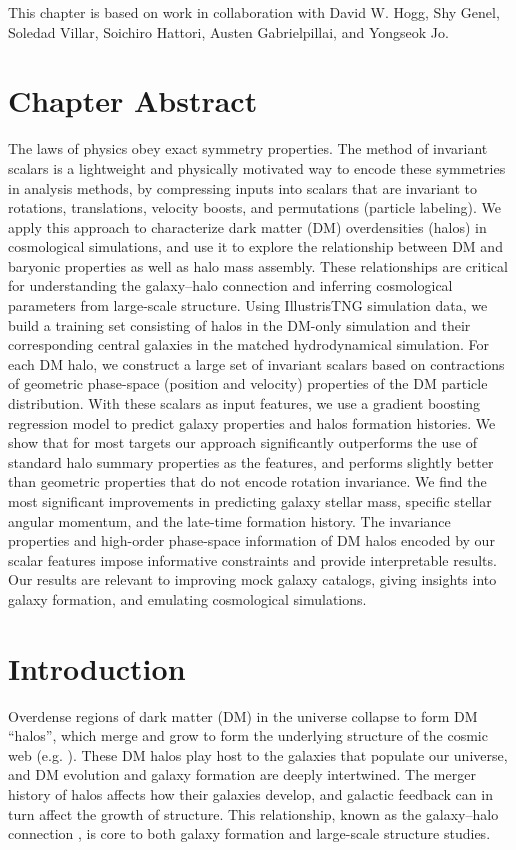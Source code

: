 This chapter is based on work in collaboration with David W. Hogg, Shy Genel, Soledad Villar, Soichiro Hattori, Austen Gabrielpillai, and Yongseok Jo.

\graphicspath{{figures/figures_eqcosmo/}}


\section{Chapter Abstract}
The laws of physics obey exact symmetry properties.
The method of invariant scalars is a lightweight and physically motivated way to encode these symmetries in analysis methods, by compressing inputs into scalars that are invariant to rotations, translations, velocity boosts, and permutations (particle labeling).
We apply this approach to characterize dark matter (DM) overdensities (halos) in cosmological simulations, and use it to explore the relationship between DM and baryonic properties as well as halo mass assembly.
These relationships are critical for understanding the galaxy--halo connection and inferring cosmological parameters from large-scale structure.
Using IllustrisTNG simulation data, we build a training set consisting of halos in the DM-only simulation and their corresponding central galaxies in the matched hydrodynamical simulation. 
For each DM halo, we construct a large set of invariant scalars based on contractions of geometric phase-space (position and velocity) properties of the DM particle distribution.
With these scalars as input features, we use a gradient boosting regression model to predict galaxy properties and halos formation histories.
We show that for most targets our approach significantly outperforms the use of standard halo summary properties as the features, and performs slightly better than geometric properties that do not encode rotation invariance.
We find the most significant improvements in predicting galaxy stellar mass, specific stellar angular momentum, and the late-time formation history.
The invariance properties and high-order phase-space information of DM halos encoded by our scalar features impose informative constraints and provide interpretable results.
Our results are relevant to improving mock galaxy catalogs, giving insights into galaxy formation, and emulating cosmological simulations.


\section{Introduction}

Overdense regions of dark matter (DM) in the universe collapse to form DM ``halos'', which merge and grow to form the underlying structure of the cosmic web (e.g. \citealt{davis_evolution_1985,bond_how_1996,boylan-kolchin_resolving_2009}). 
These DM halos play host to the galaxies that populate our universe, and DM evolution and galaxy formation are deeply intertwined. 
The merger history of halos affects how their galaxies develop, and galactic feedback can in turn affect the growth of structure.
This relationship, known as the galaxy--halo connection \citep{WechslerTinker2018}, is core to both galaxy formation and large-scale structure studies.

